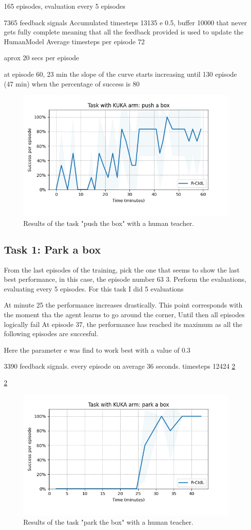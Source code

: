 165 episodes, evaluation every 5 episodes

7365 feedback signals
Accumulated timesteps 13135
e 0.5, buffer 10000 that never gets fully complete meaning that all the feedback provided is used to update the HumanModel
Average timesteps per episode 72

aprox 20 secs per episode

at episode 60, 23 min the slope of the curve starts increasing until 130 episode (47 min) when the percentage of success is 80%



\begin{figure}[H]
    \centering
    \includegraphics[width=.7\textwidth]{figures/push_1.png}
    \caption{Results of the task "push the box" with a human teacher.}
    \label{fig:kukapush}
\end{figure}

\subsection{Task 1: Park a box}
\label{subsection:results_kuka_park}


From the last episodes of the training, pick the one that seems to show the last best performance, in this case, the episode number 63
3. Perform the evaluations, evaluating every 5 episodes. For this task I did 5 evaluations

At minute 25 the performance increases drastically. This point corresponds with the moment tha the agent learns to go around the corner, Until then all episodes logically fail
At episode 37, the performance has reached its maximum as all the following episodes are succesful.

Here the parameter e was find to work best with a value of 0.3

3390 feedback signals.
every episode on average 36 seconds.
timesteps 12424
\ref{fig:kukapark}


\ref{fig:kukapark}
\begin{figure}[H]
    \centering
    \includegraphics[width=.7\textwidth]{figures/park_1.png}
    \caption{Results of the task "park the box" with a human teacher.}
    \label{fig:kukapark}
\end{figure}